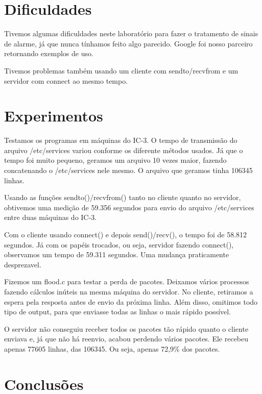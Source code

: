 \documentclass[12pt,a4paper]{article}
\begin{document}
\section{Dificuldades}

Tivemos algumas dificuldades neste laboratório para fazer o tratamento de sinais de alarme, já que nunca tínhamos feito algo parecido. Google foi nosso parceiro retornando exemplos de uso.

Tivemos problemas também usando um cliente com sendto/recvfrom e um servidor com connect ao mesmo tempo. 

\section{Experimentos}

Testamos os programas em máquinas do IC-3. O tempo de transmissão do arquivo /etc/services variou conforme os diferente métodos usados. Já que o tempo foi muito pequeno, geramos um arquivo 10 vezes maior, fazendo concatenando o /etc/services nele mesmo. O arquivo que geramos tinha 106345 linhas. 

Usando as funções sendto()/recvfrom() tanto no cliente quanto no servidor, obtivemos uma medição de 59.356 segundos para envio do arquivo /etc/services entre duas máquinas do IC-3.

Com o cliente usando connect() e depois send()/recv(), o tempo foi de 58.812 segundos. Já com os papéis trocados, ou seja, servidor fazendo connect(), observamos um tempo de 59.311 segundos. Uma mudança praticamente desprezavel.

Fizemos um flood.c para testar a perda de pacotes. Deixamos vários processos fazendo cálculos inúteis na mesma máquina do servidor. No cliente, retiramos a espera pela resposta antes de envio da próxima linha. Além disso, omitimos todo tipo de output, para que enviasse todas as linhas o mais rápido possível.

O servidor não conseguiu receber todos os pacotes tão rápido quanto o cliente enviava e, já que não há reenvio, acabou perdendo vários pacotes. Ele recebeu apenas 77605 linhas, das 106345. Ou seja, apenas 72,9\% dos pacotes.

\section{Conclusões}
\end{document}
